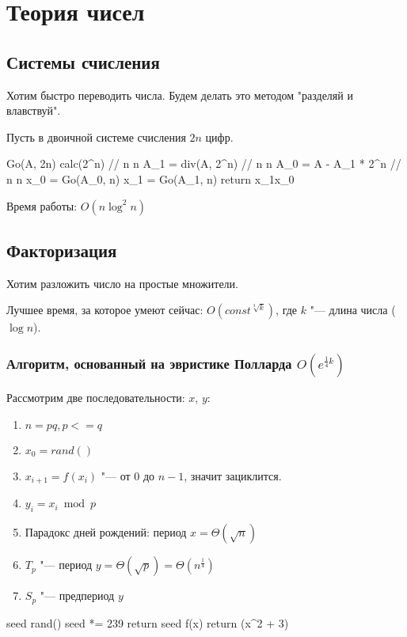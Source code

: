\chapter{Теория чисел}

\section{Системы счисления}

Хотим быстро переводить числа. Будем делать это методом "разделяй и влавствуй".

Пусть в двоичной системе счисления $2n$ цифр.

\begin{cppcode}
Go(A, 2n) 
	calc(2^n) 			// n \log n
	A_1 = div(A, 2^n)		// n \log n
	A_0 = A - A_1 * 2^n 	// n \log n
	x_0 = Go(A_0, n)
	x_1 = Go(A_1, n)
	return x_1x_0
\end{cppcode}

Время работы: $O(n \log^2 n)$

\section{Факторизация}

Хотим разложить число на простые множители.

Лучшее время, за которое умеют сейчас: $O(const^{\sqrt[3]{k}})$, где $k$ "--- длина числа ($\log n$).

\subsection{Алгоритм, основанный на эвристике Полларда \texorpdfstring{$O(e^{\frac{1}{4}k})$}{O(e\textasciicircum(1/4) k)}}

Рассмотрим две последовательности: $x$, $y$:
\begin{enumerate}
	\item $n = pq, p <= q$
	\item $x_0 = rand()$
	\item $x_{i+1} = f(x_i)$ "--- от 0 до $n-1$, значит зациклится.
	\item $y_i = x_i \bmod p$
	\item Парадокс дней рождений: период $x = \Theta(\sqrt{n})$
	\item $T_p$ "--- период $y = \Theta(\sqrt{p}) = \Theta(n^{\frac14})$
	\item $S_p$ "--- предпериод $y$
\end{enumerate}

\begin{cppcode}
seed
rand()
	seed *= 239
	return seed
f(x)
	return (x^2 + 3) %
\end{cppcode}

